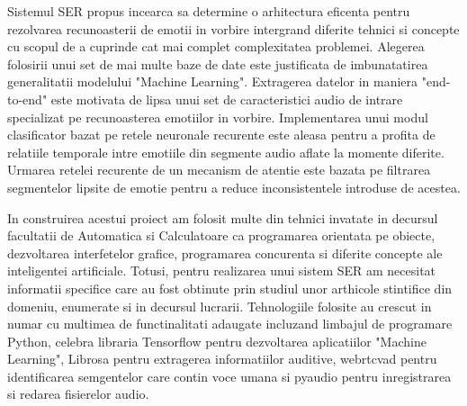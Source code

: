 \documentclass[a4paper,12pt]{book}
\begin{document}
		Sistemul SER propus incearca sa determine o arhitectura eficenta pentru rezolvarea recunoasterii de emotii in vorbire intergrand diferite tehnici si concepte cu scopul de a cuprinde cat mai complet complexitatea problemei. Alegerea folosirii unui set de mai multe baze de date este justificata de imbunatatirea generalitatii modelului "Machine Learning". Extragerea datelor in maniera "end-to-end" este motivata de lipsa unui set de caracteristici audio de intrare specializat pe recunoasterea emotiilor in vorbire. Implementarea unui modul clasificator bazat pe retele neuronale recurente este aleasa pentru a profita de relatiile temporale intre emotiile din segmente audio aflate la momente diferite. Urmarea retelei recurente de un mecanism de atentie este bazata pe filtrarea segmentelor lipsite de emotie pentru a reduce inconsistentele introduse de acestea. \par
				
		In construirea acestui proiect am folosit multe din tehnici invatate in decursul facultatii de Automatica si Calculatoare ca programarea orientata pe obiecte, dezvoltarea interfetelor grafice, programarea concurenta si diferite concepte ale inteligentei artificiale. Totusi, pentru realizarea unui sistem SER am necesitat informatii specifice care au fost obtinute prin studiul unor arthicole stintifice din domeniu, enumerate si in decursul lucrarii. Tehnologiile folosite au crescut in numar cu multimea de functinalitati adaugate incluzand limbajul de programare Python, celebra libraria Tensorflow pentru dezvoltarea aplicatiilor "Machine Learning", Librosa pentru extragerea informatiilor auditive, webrtcvad pentru identificarea semgentelor care contin voce umana si pyaudio pentru inregistrarea si redarea fisierelor audio. \par
		
\end{document}
